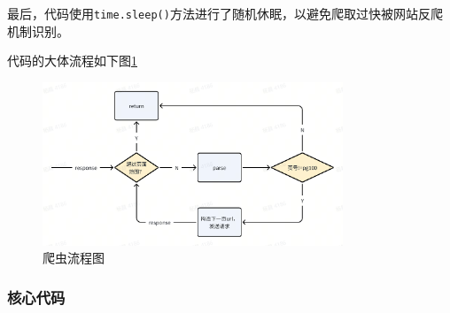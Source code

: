 \documentclass[lang=cn,11pt,a4paper]{elegantpaper}
\begin{document}
\begin{enumerate}
最后，代码使用\lstinline{time.sleep()}方法进行了随机休眠，以避免爬取过快被网站反爬机制识别。

代码的大体流程如下图\ref{fig:爬虫流程图}

\begin{figure}[htbp]
    \centering
    \includegraphics[width=0.8\textwidth, height=0.25\textheight]{image/爬虫流程图.png}
    \caption{爬虫流程图}
    \label{fig:爬虫流程图}
\end{figure}

\end{enumerate}

\subsubsection{核心代码}
\end{document}
